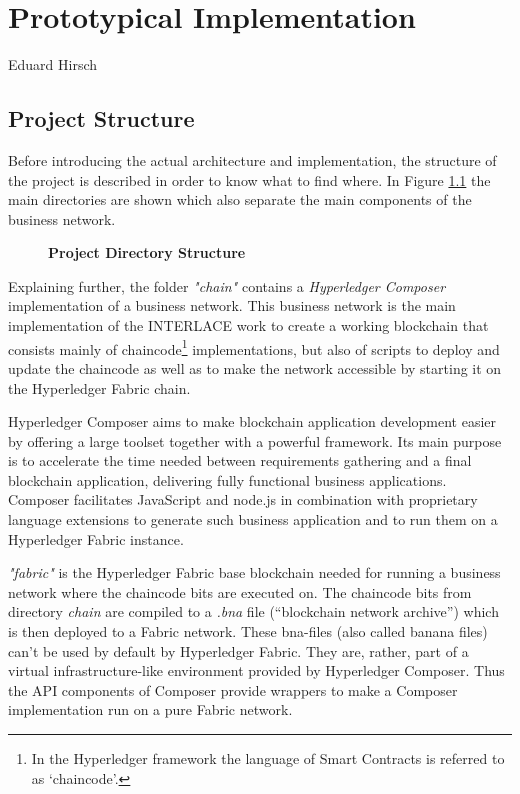 \chapter{Prototypical Implementation}
\label{ch:prototype}

\vspace{-1cm}
\begin{center}
Eduard Hirsch
\end{center}

\section{Project Structure}
\label{sec:project-structure}

Before introducing the actual architecture and implementation, the structure of the project is described in order to know what to find where. In Figure \ref{fig:directory-structure} the main directories are shown which also separate the main components of the business network.

\begin{figure}[htbp]
\centering
\begin{minipage}{5cm}
\end{minipage}
\caption{\bf\small Project Directory Structure}
\label{fig:directory-structure}
\end{figure}

Explaining further, the folder \textit{"chain"} contains a \textit{Hyperledger Composer} implementation of a business network. This business network is the main implementation of the INTERLACE work to create a working blockchain that consists mainly of chaincode\footnote{In the Hyperledger framework the language of Smart Contracts is referred to as `chaincode'.} implementations, but also of scripts to deploy and update the chaincode as well as to make the network accessible by starting it on the Hyperledger Fabric chain.

Hyperledger Composer aims to make blockchain application development easier by offering a large toolset together with a powerful framework. Its main purpose is to accelerate the time needed between requirements gathering and a final blockchain application, delivering fully functional business applications. Composer facilitates JavaScript and node.js in combination with proprietary language extensions to generate such business application and to run them on a Hyperledger Fabric instance.

\textit{"fabric"} is the Hyperledger Fabric base blockchain needed for running a business network where the chaincode bits are executed on. The chaincode bits from directory \textit{chain} are compiled to a \textit{.bna} file (``blockchain network archive'') which is then deployed to a Fabric network. These bna-files (also called banana files) can't be used by default by Hyperledger Fabric. They are, rather, part of a virtual infrastructure-like environment provided by Hyperledger Composer. Thus the API components of Composer provide wrappers to make a Composer implementation run on a pure Fabric network.

